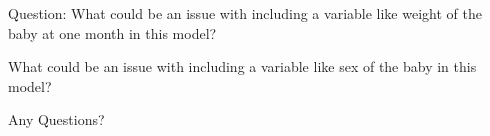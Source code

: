 \documentclass[10pt,t]{beamer}
\begin{document}

\begin{frame}
	Question: What could be an issue with including a variable like weight of the baby at one month in this model?
	\bigskip
	
	What could be an issue with including a variable like sex of the baby in this model?
	
\end{frame}


\begin{frame}[c]
\centering \huge Any Questions?
\end{frame}
\end{document}

